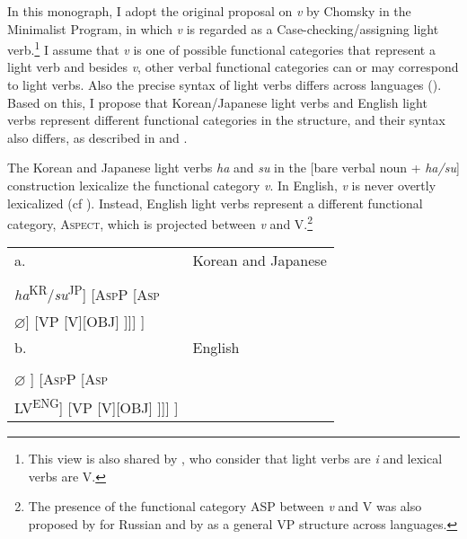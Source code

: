 In this monograph, I adopt the original proposal on \textit{v} by Chomsky in the Minimalist Program, in which  \textit{v} is regarded as a Case-checking/assigning light verb.\footnote{This view is also shared by \citet{HaleKeyser1993}, who consider that light verbs are \textit{i} and lexical verbs are V.} I assume that \textit{v} is one of possible functional categories that represent a light verb and besides \textit{v}, other verbal functional categories can or may correspond to light verbs. Also the precise syntax of light verbs differs across languages (\citealt{Adger2003,Butt2003}). Based on this, I propose that Korean/Japanese light verbs and English light verbs represent different functional categories in the structure, and their syntax also differs, as described in  and .

\ea\label{ex:52}
\ea The Korean and Japanese light verbs \textit{ha} and \textit{su} in the [bare verbal noun + \textit{ha/su}] construction lexicalize the functional category \textit{v}.
\ex  In English, \textit{v} is never overtly lexicalized (cf \citealt[351]{Chomsky1995}). Instead, English light verbs represent a different functional category, A\textsc{spect}, which is projected between \textit{v} and V.\footnote{The presence of the functional category \ac{ASP} between \textit{v} and V was also proposed by \citet{Richardson2003} for Russian and by \citet{Travis2000,Travis2010} as a general \ac{VP} structure across languages.}
\z
\ex\label{ex:53}
 \begin{tabular}[t]{ll}
 a. & Korean and Japanese  \\
   & \begin{forest}
  [\textit{v}P [SUB] 
  [\textit{v}$'$ [\textit{v}\textsuperscript{[+\textsc{epp}]} \\ \textit{ha}\textsuperscript{KR}/\textit{su}\textsuperscript{JP}]
  [A\textsc{sp}P [A\textsc{sp} \\ $\varnothing$]
  [VP [V][OBJ] ]]] ]
  \end{forest}
  \\
b. & English \\
& \begin{forest}
  [\textit{v}P [SUB] 
  [\textit{v}$'$ [\textit{v}\textsuperscript{[-\textsc{epp}]} \\ $\varnothing$ ]
  [A\textsc{sp}P [A\textsc{sp} \\ LV\textsuperscript{ENG}]
  [VP [V][OBJ] ]]] ]
  \end{forest}  
 \end{tabular}
\z

